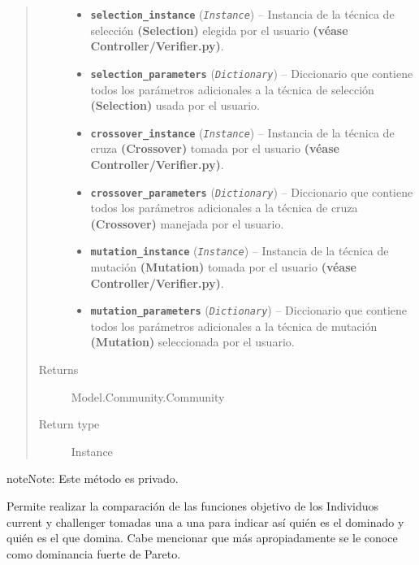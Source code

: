 \documentclass[class=report, crop=false]{standalone}
\begin{document}
\begin{fulllineitems}
\begin{quote}
\begin{description}
\begin{itemize}
\item \textbf{\texttt{selection\_instance}} (\emph{\texttt{Instance}}) -- Instancia de la técnica de selección \textbf{(Selection)} elegida por el usuario
\textbf{(véase Controller/Verifier.py)}.
\item \textbf{\texttt{selection\_parameters}} (\emph{\texttt{Dictionary}}) -- Diccionario que contiene todos los parámetros adicionales a la técnica
de selección \textbf{(Selection)} usada por el usuario.
\item \textbf{\texttt{crossover\_instance}} (\emph{\texttt{Instance}}) -- Instancia de la técnica de cruza \textbf{(Crossover)} tomada por el usuario
\textbf{(véase Controller/Verifier.py)}.
\item \textbf{\texttt{crossover\_parameters}} (\emph{\texttt{Dictionary}}) -- Diccionario que contiene todos los parámetros adicionales a la técnica
de cruza \textbf{(Crossover)} manejada por el usuario.
\item \textbf{\texttt{mutation\_instance}} (\emph{\texttt{Instance}}) -- Instancia de la técnica de mutación \textbf{(Mutation)} tomada por el usuario
\textbf{(véase Controller/Verifier.py)}.
\item \textbf{\texttt{mutation\_parameters}} (\emph{\texttt{Dictionary}}) -- Diccionario que contiene todos los parámetros adicionales a la técnica
de mutación \textbf{(Mutation)} seleccionada por el usuario.
\end{itemize}
\item[{Returns}] \leavevmode
Model.Community.Community
\item[{Return type}] \leavevmode
Instance
\end{description}\end{quote}


\begin{fulllineitems}


\begin{notice}{note}{Note:}
Este método es privado.
\end{notice}

Permite realizar la comparación de las funciones objetivo 
de los Individuos current y challenger tomadas una a una 
para indicar así quién es el dominado y quién es el que domina. 
Cabe mencionar que más apropiadamente se le conoce como dominancia 
fuerte de Pareto.


\end{fulllineitems}
\end{fulllineitems}
\end{document}
